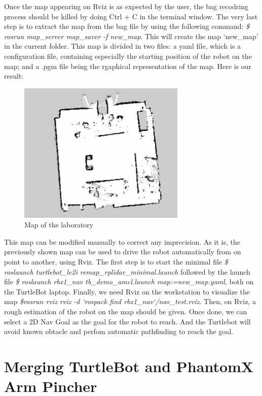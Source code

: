 \documentclass[aps,letterpaper,11pt]{revtex4}
\begin{document}
Once the map appearing on Rviz is as expected by the user, the bag recodring process should be killed by doing Ctrl + C in the terminal window. 
The very last step is to extract the map from the bag file by using the following command: \textit{\$ rosrun map\_server map\_saver -f new\_map}. This will create the map `new\_map' in the current folder. This map is divided in two files: a yaml file, which is a configuration file, containing especially the starting position of the robot on the map; and a .pgm file being the rgaphical representation of the map. Here is our result:

\begin{figure}[H]
	\centering
	\includegraphics[width=8cm]{finalmap.png}
	\caption{Map of the laboratory}
	\label{fig: map}    
\end{figure} 

This map can be modified manually to correct any imprecision. As it is, the previously shown map can be used to drive the robot automatically from on point to another, using Rviz. The first step is to start the minimal file \textit{\$ roslaunch turtlebot\_le2i  remap\_rplidar\_minimal.launch} followed by the launch file \textit{\$ roslaunch rbx1\_nav tb\_demo\_amcl.launch map:=new\_map.yaml}, both on the TurtleBot laptop. Finally, we need Rviz on the workstation to visualize the map \textit{\$rosrun rviz rviz -d `rospack find rbx1\_nav`/nav\_test.rviz}. Then, on Rviz, a rough estimation of the robot on the map should be given. Once done, we can select a 2D Nav Goal as the goal for the robot to reach. And the Turtlebot will avoid known obtacle and perfom automatic pathfinding to reach the goal. 

\section{Merging TurtleBot and PhantomX Arm Pincher}
\end{document}
